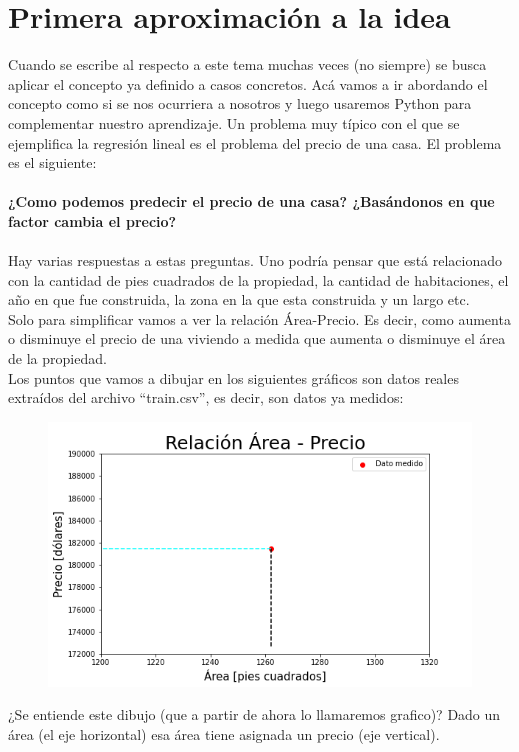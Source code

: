 \documentclass{article}
\begin{document}
\section{Primera aproximación a la idea}
Cuando se escribe al respecto a este tema muchas veces (no siempre) se busca aplicar el concepto ya definido a casos concretos. Acá
vamos a ir abordando el concepto como si se nos ocurriera a nosotros y luego usaremos Python para complementar nuestro aprendizaje.\newline
 Un problema muy típico con el que se ejemplifica la regresión lineal es el problema del precio de una casa.  El problema es el siguiente:\\\\
\textbf{¿Como podemos predecir el precio de una casa? ¿Basándonos en que factor cambia el precio?} \\\\
Hay varias respuestas a estas preguntas. Uno podría pensar que está relacionado con la cantidad de pies cuadrados de la propiedad, la cantidad de habitaciones, el año en que fue construida, la zona en la que esta construida y un largo etc.\\
Solo para simplificar vamos a ver la relación Área-Precio. Es decir, como aumenta o disminuye el precio de una viviendo a medida que aumenta o disminuye el área de la propiedad.\\
Los puntos que vamos a dibujar en los siguientes gráficos son datos reales extraídos del archivo 
``train.csv”, es decir, son datos ya medidos:
\begin{figure}[h]
\includegraphics[scale=0.5]{Imagenes/unico_punto.png}
\centering
\end{figure}
\newpage
¿Se entiende este dibujo (que a partir de ahora lo llamaremos grafico)? Dado un área (el eje horizontal) esa área tiene asignada un precio (eje vertical).\\
\end{document}
